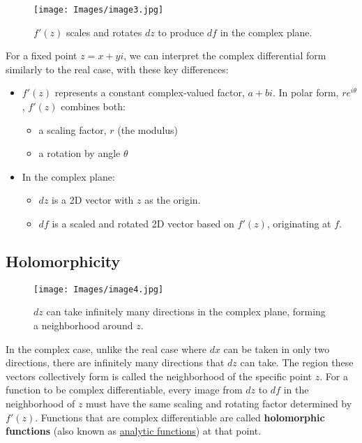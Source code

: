 \documentclass[a4paper,10.5pt]{article}
\begin{document}
\begin{figure}[htp]
    \centering
    \texttt{[image: Images/image3.jpg]}
    \caption{\( f'(z) \) scales and rotates \( dz \) to produce \( df \) in the complex plane.}
    \label{fig:galaxy}
\end{figure}

For a fixed point $z = x+yi$, we can interpret the complex differential form similarly to the real case, with these key differences:

\begin{itemize}
    \item $f'(z)$ represents a constant complex-valued factor, $a+bi$. In polar form,  $re^{i\theta}$, $f'(z)$ combines both:
    \begin{itemize}
        \item a scaling factor, $r$ (the modulus)
        \item a rotation by angle $\theta$
    \end{itemize}
    \item In the complex plane:
    \begin{itemize}
        \item $dz$ is a 2D vector with $z$ as the origin.
        \item $df$ is a scaled and rotated 2D vector based on $f'(z)$, originating at $f$.
    \end{itemize}
\end{itemize}

\subsection{Holomorphicity}

\begin{figure}[H]
    \centering
    \texttt{[image: Images/image4.jpg]}
    \caption{\( dz \) can take infinitely many directions in the complex plane, forming a neighborhood around \( z \).}
    \label{fig:galaxy}
\end{figure}

In the complex case, unlike the real case where $dx$ can be taken in only two directions, there are infinitely many directions that $dz$ can take. The region these vectors collectively form is called the neighborhood of the specific point $z$. For a function to be complex differentiable, every image from $dz$ to $df$ in the neighborhood of $z$ must have the same scaling and rotating factor determined by $f'(z)$. Functions that are complex differentiable are called \textbf{holomorphic functions} (also known as \href{https://mathworld.wolfram.com/AnalyticFunction.html}{analytic functions}) at that point.
\end{document}
